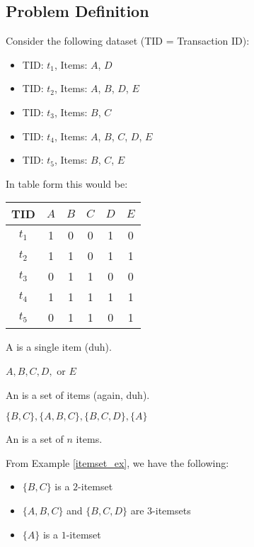 \documentclass[../main/main.tex]{subfiles}
\begin{document}
\subsection{Problem Definition}
Consider the following dataset (TID = Transaction ID):
\begin{itemize}
	\item TID: $t_1$, Items: $A$, $D$
	\item TID: $t_2$, Items: $A$, $B$, $D$, $E$
	\item TID: $t_3$, Items: $B$, $C$
	\item TID: $t_4$, Items: $A$, $B$, $C$, $D$, $E$
	\item TID: $t_5$, Items: $B$, $C$, $E$
\end{itemize}
In table form this would be:
\begin{table}[htpb]
	\centering
	\label{tab:label}
	\begin{tabular}{|c|c|c|c|c|c|}
	\hline
	TID & $A$ & $B$ & $C$ & $D$ & $E$ \\
	\hline
	$t_1$ & 1 & 0 & 0 & 1 & 0 \\
	$t_2$ & 1 & 1 & 0 & 1 & 1 \\
	$t_3$ & 0 & 1 & 1 & 0 & 0 \\
	$t_4$ & 1 & 1 & 1 & 1 & 1 \\
	$t_5$ & 0 & 1 & 1 & 0 & 1 \\
	\hline
	\end{tabular}
\end{table}
\begin{definition}
	A  is a single item (duh).
\end{definition}
\begin{example}
	$A, B, C, D,$ or $E$
\end{example}
\begin{definition}
	An  is a set of items (again, duh).
\end{definition}
\begin{example}\label{itemset_ex}
	$\{B,C\}, \{A,B,C\}, \{B,C,D\}, \{A\}$
\end{example}
\begin{definition}
	An  is a set of $n$ items.
\end{definition}
\begin{example}
	From Example \ref{itemset_ex}, we have the following:
	\begin{itemize}
		\item $\{B,C\} $ is a $2$-itemset
		\item $\{A,B,C\} $ and $\{B,C,D\} $ are $3$-itemsets
		\item $\{A\} $ is a $1$-itemset
	\end{itemize}
\end{example} 
\end{document}
